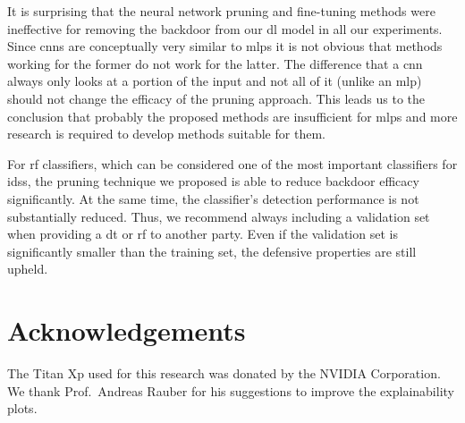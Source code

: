 \documentclass[9pt,sigconf,letterpaper,dvipsnames\ifx\removeHeaders\tempYes ,nonacm\fi]{acmart}
\begin{document}
It is surprising that the neural network pruning and fine-tuning methods were ineffective for removing the backdoor from our \gls{dl} model in all our experiments. Since \glspl{cnn} are conceptually very similar to \glspl{mlp} it is not obvious that methods working for the former do not work for the latter. The difference that a \gls{cnn} always only looks at a portion of the input \cite{wikipedia_convolutional_2019} and not all of it (unlike an \gls{mlp}) should not change the efficacy of the pruning approach. This leads us to the conclusion that probably the proposed methods are insufficient for \glspl{mlp} and more research is required to develop methods suitable for them.

For \gls{rf} classifiers, which can be considered one of the most important classifiers for \glspl{ids}, the pruning technique we proposed is able to reduce backdoor efficacy significantly. At the same time, the classifier's detection performance is not substantially reduced. Thus, we recommend always including a validation set when providing a \gls{dt} or \gls{rf} to another party. Even if the validation set is significantly smaller than the training set, the defensive properties are still upheld.

\section*{Acknowledgements}
The Titan Xp used for this research was donated by the NVIDIA Corporation. We thank Prof.~Andreas Rauber for his suggestions to improve the explainability plots.



\end{document}
